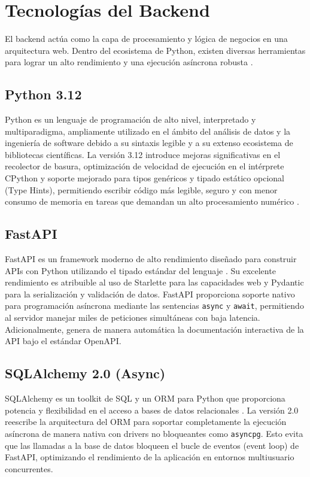 \section{Tecnologías del Backend}

El backend actúa como la capa de procesamiento y lógica de negocios en una arquitectura web. Dentro del ecosistema de Python, existen diversas herramientas para lograr un alto rendimiento y una ejecución asíncrona robusta \cite{python2024, ramirez2024}.

\subsection{Python 3.12}
Python es un lenguaje de programación de alto nivel, interpretado y multiparadigma, ampliamente utilizado en el ámbito del análisis de datos y la ingeniería de software debido a su sintaxis legible y a su extenso ecosistema de bibliotecas científicas. La versión 3.12 introduce mejoras significativas en el recolector de basura, optimización de velocidad de ejecución en el intérprete CPython y soporte mejorado para tipos genéricos y tipado estático opcional (Type Hints), permitiendo escribir código más legible, seguro y con menor consumo de memoria en tareas que demandan un alto procesamiento numérico \cite{python2024}.

\subsection{FastAPI}
FastAPI es un framework moderno de alto rendimiento diseñado para construir APIs con Python utilizando el tipado estándar del lenguaje \cite{ramirez2024}. Su excelente rendimiento es atribuible al uso de Starlette para las capacidades web y Pydantic para la serialización y validación de datos. FastAPI proporciona soporte nativo para programación asíncrona mediante las sentencias \texttt{async} y \texttt{await}, permitiendo al servidor manejar miles de peticiones simultáneas con baja latencia. Adicionalmente, genera de manera automática la documentación interactiva de la API bajo el estándar OpenAPI.

\subsection{SQLAlchemy 2.0 (Async)}
SQLAlchemy es un toolkit de SQL y un ORM para Python que proporciona potencia y flexibilidad en el acceso a bases de datos relacionales \cite{bayer2024}. La versión 2.0 reescribe la arquitectura del ORM para soportar completamente la ejecución asíncrona de manera nativa con drivers no bloqueantes como \texttt{asyncpg}. Esto evita que las llamadas a la base de datos bloqueen el bucle de eventos (event loop) de FastAPI, optimizando el rendimiento de la aplicación en entornos multiusuario concurrentes.

